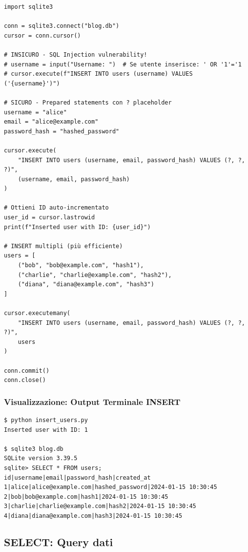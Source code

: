 \begin{lstlisting}
import sqlite3

conn = sqlite3.connect("blog.db")
cursor = conn.cursor()

# INSICURO - SQL Injection vulnerability!
# username = input("Username: ")  # Se utente inserisce: ' OR '1'='1
# cursor.execute(f"INSERT INTO users (username) VALUES ('{username}')")

# SICURO - Prepared statements con ? placeholder
username = "alice"
email = "alice@example.com"
password_hash = "hashed_password"

cursor.execute(
    "INSERT INTO users (username, email, password_hash) VALUES (?, ?, ?)",
    (username, email, password_hash)
)

# Ottieni ID auto-incrementato
user_id = cursor.lastrowid
print(f"Inserted user with ID: {user_id}")

# INSERT multipli (più efficiente)
users = [
    ("bob", "bob@example.com", "hash1"),
    ("charlie", "charlie@example.com", "hash2"),
    ("diana", "diana@example.com", "hash3")
]

cursor.executemany(
    "INSERT INTO users (username, email, password_hash) VALUES (?, ?, ?)",
    users
)

conn.commit()
conn.close()
\end{lstlisting}

\subsubsection{Visualizzazione: Output Terminale INSERT}

\begin{tcolorbox}[colback=black!5, colframe=black!75, title=Esecuzione INSERT con SQLite3, fonttitle=\bfseries\ttfamily]
\begin{verbatim}
$ python insert_users.py
Inserted user with ID: 1

$ sqlite3 blog.db
SQLite version 3.39.5
sqlite> SELECT * FROM users;
id|username|email|password_hash|created_at
1|alice|alice@example.com|hashed_password|2024-01-15 10:30:45
2|bob|bob@example.com|hash1|2024-01-15 10:30:45
3|charlie|charlie@example.com|hash2|2024-01-15 10:30:45
4|diana|diana@example.com|hash3|2024-01-15 10:30:45
\end{verbatim}
\end{tcolorbox}

\subsection{SELECT: Query dati}

